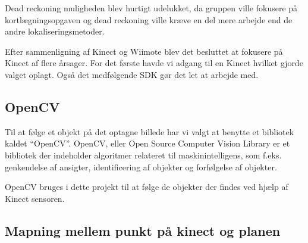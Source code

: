 Dead reckoning muligheden blev hurtigt udelukket, da gruppen ville fokusere på kortlægningsopgaven og dead reckoning ville kræve en del mere arbejde end de andre lokaliseringsmetoder.

Efter sammenligning af Kinect og Wiimote blev det besluttet at fokusere på Kinect af flere årsager.
For det første havde vi adgang til en Kinect hvilket gjorde valget oplagt. 
Også det medfølgende SDK gør det let at arbejde med.

\subsection{OpenCV}
Til at følge et objekt på det optagne billede har vi valgt at benytte et bibliotek kaldet ``OpenCV''.
OpenCV, eller Open Source Computer Vision Library er et bibliotek der indeholder algoritmer relateret til maskinintelligens, som f.eks. genkendelse af ansigter, identificering af objekter og forfølgelse af objekter.\cite{opencv}

OpenCV bruges i dette projekt til at følge de objekter der findes ved hjælp af Kinect sensoren.

\subsection{Mapning mellem punkt på kinect og planen}
\begin{figure}
\end{figure}

